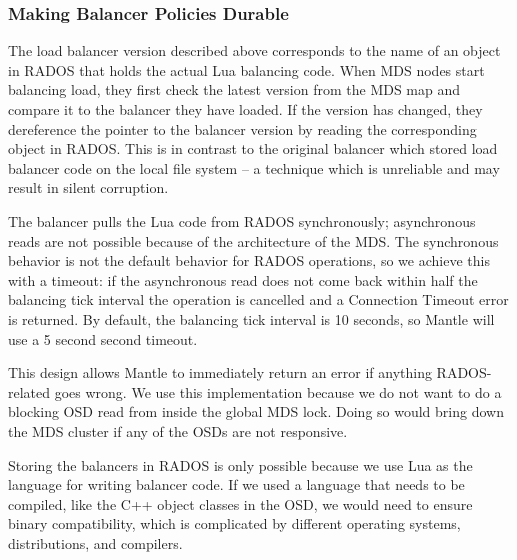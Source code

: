 \documentclass[preprint]{sigplanconf-eurosys}
\begin{document}

\subsubsection{Making Balancer Policies Durable}

The load balancer version described above corresponds to the name of an object
in RADOS that holds the actual Lua balancing code.
When MDS nodes start balancing load, they first check the latest version from
the MDS map and compare it to the balancer they have loaded. If the version has
changed, they dereference the pointer to the balancer version by reading the
corresponding object in RADOS. This is in contrast to the original balancer
which stored load balancer code on the local file system -- a technique which
is unreliable and may result in silent corruption.

The balancer pulls the Lua code from RADOS synchronously; asynchronous reads
are not possible because of the architecture of the MDS. The synchronous
behavior is not the default behavior for RADOS operations, so we achieve this
with a timeout: if the asynchronous read does not come back within half the
balancing tick interval the operation is cancelled and a Connection Timeout
error is returned. By default, the balancing tick interval is 10 seconds, so
Mantle will use a 5 second second timeout.

This design allows Mantle to immediately return an error if anything
RADOS-related goes wrong.  We use this implementation because we do not want to
do a blocking OSD read from inside the global MDS lock. Doing so would bring
down the MDS cluster if any of the OSDs are not responsive.

Storing the balancers in RADOS is only possible because we use Lua as the
language for writing balancer code. If we used a language that needs to be
compiled, like the C++ object classes in the OSD, we would need to ensure
binary compatibility, which is complicated by different operating systems,
distributions, and compilers.
\end{document}
